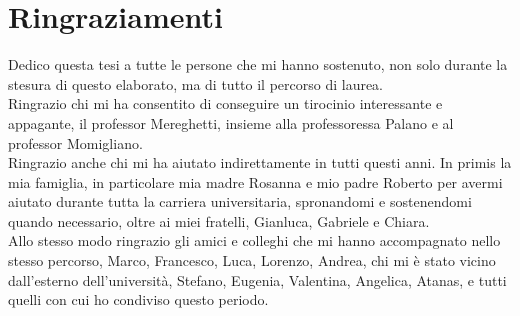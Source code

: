 \chapter*{Ringraziamenti}
Dedico questa tesi a tutte le persone che mi hanno sostenuto, non solo durante la stesura di questo elaborato, ma di tutto il percorso di laurea.\\
Ringrazio chi mi ha consentito di conseguire un tirocinio interessante e appagante, il professor Mereghetti, insieme alla professoressa Palano e al professor Momigliano.\\
Ringrazio anche chi mi ha aiutato indirettamente in tutti questi anni. In primis la mia famiglia, in particolare mia madre Rosanna e mio padre Roberto per avermi aiutato durante tutta la carriera universitaria, spronandomi e sostenendomi quando necessario, oltre ai miei fratelli, Gianluca, Gabriele e Chiara.\\
Allo stesso modo ringrazio gli amici e colleghi che mi hanno accompagnato nello stesso percorso, Marco, Francesco, Luca, Lorenzo, Andrea, chi mi è stato vicino dall’esterno dell’università, Stefano, Eugenia, Valentina, Angelica, Atanas, e tutti quelli con cui ho condiviso questo periodo.